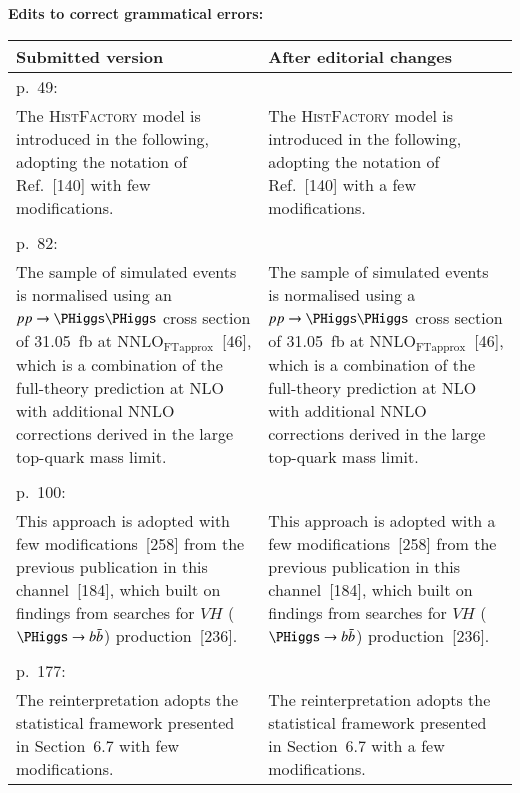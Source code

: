 \documentclass[fontsize=11pt, paper=a4]{scrartcl}
\begin{document}

\textbf{Edits to correct grammatical errors:}\\
\begin{center}
  \begin{tabular}{p{}@{\hskip 0.05\textwidth}p{}}
  \toprule
  Submitted version & After editorial changes\\
  \midrule

  p.\ 49: &\\
  The \textsc{HistFactory} model is introduced in the following, adopting the notation of Ref.~[140] with few modifications. &
  The \textsc{HistFactory} model is introduced in the following, adopting the notation of Ref.~[140] with a few modifications.\\\\

  p.\ 82: &\\
  The sample of simulated events is normalised using an $\pp \to \HH$ cross section of \SI{31.05}{\femto\barn} at $\text{NNLO}_{\text{FTapprox}}$~[46], which is a combination of the full-theory prediction at NLO with additional NNLO corrections derived in the large top-quark mass limit. &
  The sample of simulated events is normalised using a $\pp \to \HH$ cross section of \SI{31.05}{\femto\barn} at $\text{NNLO}_{\text{FTapprox}}$~[46], which is a combination of the full-theory prediction at NLO with additional NNLO corrections derived in the large top-quark mass limit.\\\\

  p.\ 100: &\\
  This approach is adopted with few modifications~[258] from the previous publication in this channel~[184], which built on findings from searches for $VH$ ($\PHiggs \to \bbbar$) production~[236]. &
  This approach is adopted with a few modifications~[258] from the previous publication in this channel~[184], which built on findings from searches for $VH$ ($\PHiggs \to \bbbar$) production~[236]. \\\\

  p.\ 177: &\\
  The reinterpretation adopts the statistical framework presented in Section~6.7 with few modifications. &
  The reinterpretation adopts the statistical framework presented in Section~6.7 with a few modifications.\\

  \bottomrule
\end{tabular}
\end{center}
\end{document}
